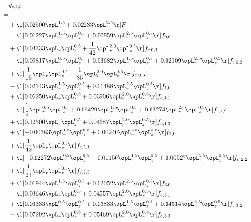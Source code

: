 \begin{alignat}{2} 
\label{eq:g_13_0} 
& g_{c,1,3} \nonumber \\ 
 = \\ 
& + \l[  0.02500 \opL_r^{1.5} +  0.02233 \opL_r^{2.5}  \r] F \nonumber \\ 
& - \l[  0.01227 \opL_r^{1.5} \opL_z^{0.5} +  0.00959 \opL_r^{2.5} \opL_z^{0.5}  \r] f_{0,0} \nonumber \\ 
& + \l[  0.03333 \opL_r \opL_z^{0.5} + \frac{1}{42} \opL_r^{2.0} \opL_z^{0.5}  \r] f_{c,0,1} \nonumber \\ 
& - \l[  0.09817 \opL_r^{0.5} \opL_z^{0.5} +  0.03682 \opL_r^{1.5} \opL_z^{0.5} +  0.02109 \opL_r^{2.5} \opL_z^{0.5}  \r] f_{c,0,2} \nonumber \\ 
& + \l[ \frac{1}{15} \opL_r \opL_z^{0.5} + \frac{1}{35} \opL_r^{2.0} \opL_z^{0.5}  \r] f_{c,0,3} \nonumber \\ 
& - \l[  0.02143 \opL_r^{1.5} \opL_z^{0.5} +  0.01488 \opL_r^{2.5} \opL_z^{0.5}  \r] f_{1,0} \nonumber \\ 
& + \l[  0.06250 \opL_r \opL_z^{0.5} +  0.03906 \opL_r^{2.0} \opL_z^{0.5}  \r] f_{c,1,1} \nonumber \\ 
& - \l[ \frac{1}{5} \opL_r^{0.5} \opL_z^{0.5} +  0.06429 \opL_r^{1.5} \opL_z^{0.5} +  0.03274 \opL_r^{2.5} \opL_z^{0.5}  \r] f_{c,1,2} \nonumber \\ 
& + \l[  0.12500 \opL_r \opL_z^{0.5} +  0.04687 \opL_r^{2.0} \opL_z^{0.5}  \r] f_{c,1,3} \nonumber \\ 
& + \l[  -0.00383 \opL_r^{1.5} \opL_z^{0.5} +  0.00240 \opL_r^{2.5} \opL_z^{0.5}  \r] f_{2,0} \nonumber \\ 
& + \l[ \frac{1}{42} \opL_r \opL_z^{0.5}  \r] f_{c,2,1} \nonumber \\ 
& + \l[  -0.12272 \opL_r^{0.5} \opL_z^{0.5}   -0.01150 \opL_r^{1.5} \opL_z^{0.5} +  0.00527 \opL_r^{2.5} \opL_z^{0.5}  \r] f_{c,2,2} \nonumber \\ 
& + \l[ \frac{1}{21} \opL_r \opL_z^{0.5}  \r] f_{c,2,3} \nonumber \\ 
& + \l[  0.01944 \opL_r^{1.5} \opL_z^{0.5} +  0.02052 \opL_r^{2.5} \opL_z^{0.5}  \r] f_{3,0} \nonumber \\ 
& - \l[  0.03646 \opL_r \opL_z^{0.5} +  0.04557 \opL_r^{2.0} \opL_z^{0.5}  \r] f_{c,3,1} \nonumber \\ 
& + \l[  0.03333 \opL_r^{0.5} \opL_z^{0.5} +  0.05833 \opL_r^{1.5} \opL_z^{0.5} +  0.04514 \opL_r^{2.5} \opL_z^{0.5}  \r] f_{c,3,2} \nonumber \\ 
& - \l[  0.07292 \opL_r \opL_z^{0.5} +  0.05469 \opL_r^{2.0} \opL_z^{0.5}  \r] f_{c,3,3} \nonumber \\ 
\end{alignat} 


